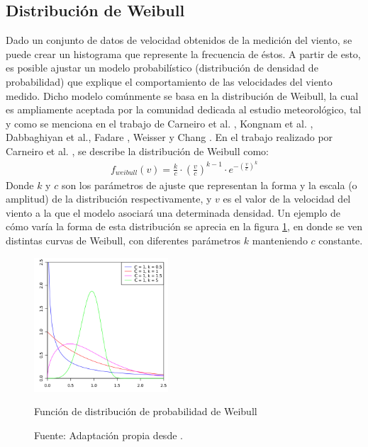 \subsection{Distribución de Weibull}
Dado un conjunto de datos de velocidad obtenidos de la medición del viento, se puede crear un histograma que represente la frecuencia de éstos. A partir de esto, es posible ajustar un modelo probabilístico (distribución de densidad de probabilidad) que explique el comportamiento de las velocidades del viento medido. Dicho modelo comúnmente se basa en la distribución de Weibull, la cual es ampliamente aceptada por la comunidad dedicada al estudio meteorológico, tal y como se menciona en el trabajo de Carneiro et al. \cite{Carneiro15}, Kongnam et al. \cite{Kongnam15}, Dabbaghiyan et al.\cite{Dabbaghiyan15}, Fadare \cite{Fadare08}, Weisser \cite{Weisser02} y Chang \cite{Chang10_2}. En el trabajo realizado por Carneiro et al. \cite{Carneiro15}, se describe la distribución de Weibull como: 
 \begin{align}\label{eq:weibull}
     f_{weibull}(v) = \frac{k}{c} \cdot (\frac{v}{c})^{k-1} \cdot e^{-(\frac{v}{c})^ k}
 \end{align}
 Donde $k$ y $c$ son los parámetros de ajuste que representan la forma y la escala (o amplitud) de la distribución respectivamente, y $v$ es el valor de la velocidad del viento a la que el modelo asociará una determinada densidad. Un ejemplo de cómo varía la forma de esta distribución se aprecia en la figura \ref{fig:weibull_fig}, en donde se ven distintas curvas de Weibull, con diferentes parámetros $k$ manteniendo $c$ constante.
\begin{figure}[h!]
    \centering    
    \includegraphics[height=50mm]{figures/weibull_distribution.png} 
    \caption{Función de distribución de probabilidad de Weibull}
    \vspace{-.25cm} 
    \caption*{Fuente: Adaptación propia desde \cite{wikiWeibull}.}
    \label{fig:weibull_fig}
\end{figure}
